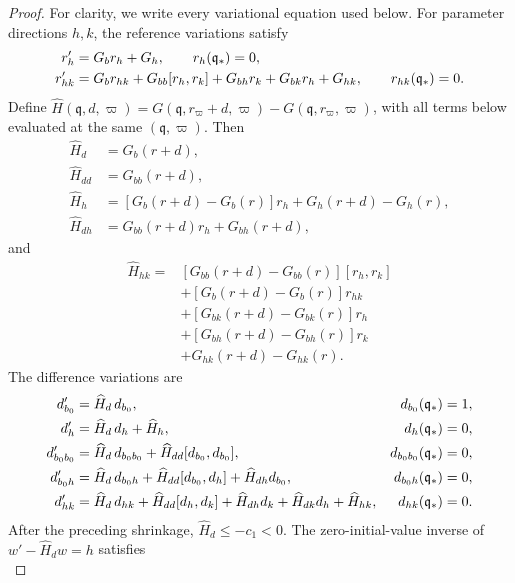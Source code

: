 \documentclass[11pt]{amsart}
\numberwithin{equation}{section}
\theoremstyle{definition}
\theoremstyle{remark}
\begin{document}
\begin{proof}
For clarity, we write every variational equation used below.  For parameter
directions $h,k$, the reference variations satisfy
\begin{align}
 r_h'&=G_b r_h+G_h,\qquad r_h(\mathfrak q_*)=0,\notag\\
 r_{hk}'&=G_b r_{hk}+G_{bb}[r_h,r_k]
       +G_{bh}r_k+G_{bk}r_h+G_{hk},\qquad
       r_{hk}(\mathfrak q_*)=0.
 \label{eq:app-alg-reference-variations}
\end{align}
Define
$\widehat H(\mathfrak q,d,\varpi)
=G(\mathfrak q,r_\varpi+d,\varpi)
 -G(\mathfrak q,r_\varpi,\varpi)$, with all terms below evaluated at the
same $(\mathfrak q,\varpi)$.  Then
\begin{align*}
 \widehat H_d&=G_b(r+d),\\
 \widehat H_{dd}&=G_{bb}(r+d),\\
 \widehat H_h&=[G_b(r+d)-G_b(r)]r_h
       +G_h(r+d)-G_h(r),\\
 \widehat H_{dh}&=G_{bb}(r+d)r_h+G_{bh}(r+d),
\end{align*}
and
\begin{align*}
 \widehat H_{hk}={}&[G_{bb}(r+d)-G_{bb}(r)][r_h,r_k]\\
 &+[G_b(r+d)-G_b(r)]r_{hk}\\
 &+[G_{bk}(r+d)-G_{bk}(r)]r_h\\
 &+[G_{bh}(r+d)-G_{bh}(r)]r_k\\
 &+G_{hk}(r+d)-G_{hk}(r).
\end{align*}
The difference variations are
\begin{align}
 d_{b_0}'&=\widehat H_d\,d_{b_0},
       &d_{b_0}(\mathfrak q_*)&=1,\notag\\
 d_h'&=\widehat H_d\,d_h+\widehat H_h,
       &d_h(\mathfrak q_*)&=0,\notag\\
 d_{b_0b_0}'&=\widehat H_d\,d_{b_0b_0}
       +\widehat H_{dd}[d_{b_0},d_{b_0}],
       &d_{b_0b_0}(\mathfrak q_*)&=0,\notag\\
 d_{b_0h}'&=\widehat H_d\,d_{b_0h}
       +\widehat H_{dd}[d_{b_0},d_h]+\widehat H_{dh}d_{b_0},
       &d_{b_0h}(\mathfrak q_*)&=0,\notag\\
 d_{hk}'&=\widehat H_d\,d_{hk}+\widehat H_{dd}[d_h,d_k]
       +\widehat H_{dh}d_k+\widehat H_{dk}d_h+\widehat H_{hk},
       &d_{hk}(\mathfrak q_*)&=0.
 \label{eq:app-alg-difference-variations}
\end{align}
After the preceding shrinkage,
$\widehat H_d\le-c_1<0$.  The zero-initial-value inverse of
$w'-\widehat H_dw=h$ satisfies
\begin{equation}\label{eq:app-alg-linear-inverse}

\end{equation}
\end{proof}
\end{document}

